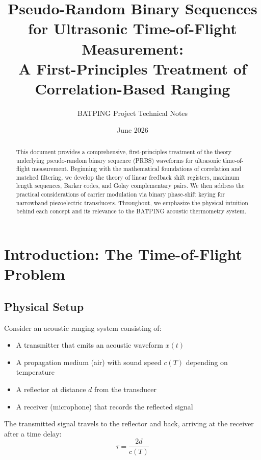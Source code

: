 \documentclass[11pt]{article}
\title{Pseudo-Random Binary Sequences for Ultrasonic Time-of-Flight Measurement: \\
\large A First-Principles Treatment of Correlation-Based Ranging}
\author{BATPING Project Technical Notes}
\date{June 2026}
\begin{document}
\maketitle

\begin{abstract}
This document provides a comprehensive, first-principles treatment of the theory underlying pseudo-random binary sequence (PRBS) waveforms for ultrasonic time-of-flight measurement. Beginning with the mathematical foundations of correlation and matched filtering, we develop the theory of linear feedback shift registers, maximum length sequences, Barker codes, and Golay complementary pairs. We then address the practical considerations of carrier modulation via binary phase-shift keying for narrowband piezoelectric transducers. Throughout, we emphasize the physical intuition behind each concept and its relevance to the BATPING acoustic thermometry system.
\end{abstract}

\tableofcontents
\newpage

\section{Introduction: The Time-of-Flight Problem}

\subsection{Physical Setup}

Consider an acoustic ranging system consisting of:
\begin{itemize}
    \item A transmitter that emits an acoustic waveform $x(t)$
    \item A propagation medium (air) with sound speed $c(T)$ depending on temperature
    \item A reflector at distance $d$ from the transducer
    \item A receiver (microphone) that records the reflected signal
\end{itemize}

The transmitted signal travels to the reflector and back, arriving at the receiver after a time delay:
\begin{equation}
\tau = \frac{2d}{c(T)}
\end{equation}
\end{document}
